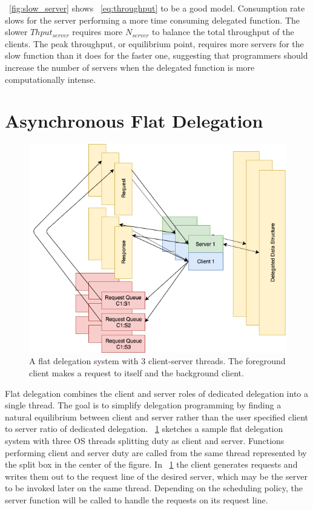\documentclass{uicthesi}
\begin{document}
~\ref{fig:slow_server} shows ~\ref{eq:throughput} to be a good model. Consumption rate slows for the server performing a more time consuming delegated function. The slower $Thput_{server}$ requires more $N_{server}$ to balance the total throughput of the clients. The peak throughput, or equilibrium point, requires more servers for the slow function than it does for the faster one, suggesting that programmers should increase the number of servers when the delegated function is more computationally intense. 

\section{Asynchronous Flat Delegation}
\begin{figure}[ht!]
\centering
\includegraphics[width=0.9\columnwidth]{FIG/flat_async.png}
\caption{A flat delegation system with 3 client-server threads. The foreground client makes a request to itself and the background client. }
\label{fig:flat_delegation}
\end{figure}

Flat delegation combines the client and server roles of dedicated delegation into a single thread. The goal is to simplify delegation programming by finding a natural equilibrium between client and server rather than the user specified client to server ratio of dedicated delegation. ~\ref{fig:flat_delegation} sketches a sample flat delegation system with three OS threads splitting duty as client and server. Functions performing client and server duty are called from the same thread represented by the split box in the center of the figure. In ~\ref{fig:flat_delegation} the client generates requests and writes them out to the request line of the desired server, which may be the server to be invoked later on the same thread. Depending on the scheduling policy, the server function will be called to handle the requests on its request line. 
\end{document}
